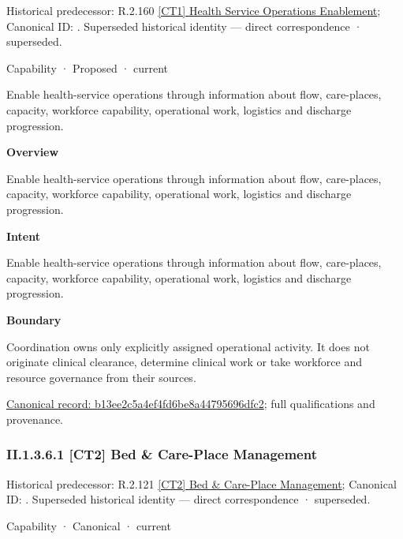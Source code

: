 {\small Historical predecessor: R.2.160 \hyperref[element:a98424298dac46d8b2ddd109d928270a]{[CT1] Health Service Operations Enablement}; Canonical ID: \texttt{}. Superseded historical identity — direct correspondence · superseded.}\par
\label{element:b13ee2c5a4ef4fd6be8a44795696dfc2}
{\small Capability · Proposed · current}\par

Enable health-service operations through information about flow, care-places, capacity, workforce capability, operational work, logistics and discharge progression.



\textbf{Overview}



Enable health-service operations through information about flow, care-places, capacity, workforce capability, operational work, logistics and discharge progression.



\textbf{Intent}



Enable health-service operations through information about flow, care-places, capacity, workforce capability, operational work, logistics and discharge progression.



\textbf{Boundary}



Coordination owns only explicitly assigned operational activity. It does not originate clinical clearance, determine clinical work or take workforce and resource governance from their sources.


{\footnotesize \href{../../../../continuum/strategy/capability/b13ee2c5a4ef4fd6be8a44795696dfc2.md}{Canonical record: b13ee2c5a4ef4fd6be8a44795696dfc2}; full qualifications and provenance.}\par
\subsubsection*{II.1.3.6.1 [CT2] Bed \& Care-Place Management}
\label{navigation:II.1.3.6.1}

{\small Historical predecessor: R.2.121 \hyperref[element:c94d29b7d1c045dabc7814ceea795484]{[CT2] Bed \& Care-Place Management}; Canonical ID: \texttt{}. Superseded historical identity — direct correspondence · superseded.}\par
\label{element:f117ccec0bfa4f738e6ddb646b3534a2}
{\small Capability · Canonical · current}\par

